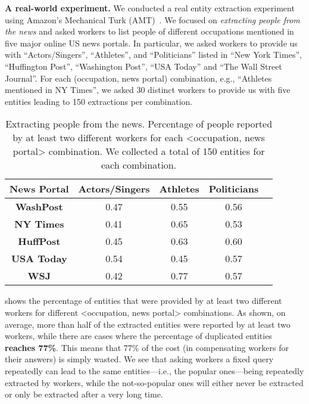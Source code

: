 \vspace{5pt}\noindent\textbf{A real-world experiment.} We conducted a real entity extraction experiment using Amazon's Mechanical Turk (AMT)~\cite{mturk}. We focused on {\em extracting people from the news} and asked workers to list people of different occupations mentioned in five major online US news portals. In particular, we asked workers to provide us with ``Actors/Singers'', ``Athletes'', and ``Politicians'' listed in ``New York Times'', ``Huffington Post'', ``Washington Post'', ``USA  Today'' and ``The Wall Street Journal''. For each (occupation, news portal) combination, e.g., ``Athletes mentioned in NY Times'', we asked 30 distinct workers to provide us with five entities leading to 150 extractions per combination.

\begin{table}[h]
\center
\vspace{-10pt}
\caption{Extracting people from the news. Percentage of people reported by at least two different workers for each <occupation, news portal> combination. We collected a total of 150 entities for each combination.}
\label{tab:duplicates}
\begin{tabular}{|c|c|c|c|c|}
\hline
News Portal & {\bf Actors/Singer}s & {\bf Athletes} & \textbf{Politicians}\\ \hline
{\bf WashPost} & 0.47 & 0.55 & 0.56 \\
{\bf NY Times} & 0.41& 0.65 & 0.53 \\
{\bf HuffPost} & 0.45 & 0.63 & 0.60 \\
{\bf USA Today} & 0.54 & 0.45 & 0.57 \\
{\bf WSJ} & 0.42 & 0.77 & 0.57 \\
\hline
\end{tabular}
\end{table}


 shows the percentage of entities that were provided by at least two different workers for different <occupation, news portal> combinations. As shown, on average, more than half of the extracted entities were reported by at least two workers, while there are cases where the percentage of duplicated entities {\bf reaches 77\%}. This means that 77\% of the cost (in compensating workers for their answers) is simply wasted. We see that asking workers a fixed query repeatedly can lead to the same entities---i.e., the popular ones---being repeatedly extracted by workers, while the not-so-popular ones will either never be extracted or only be extracted after a very long time.

